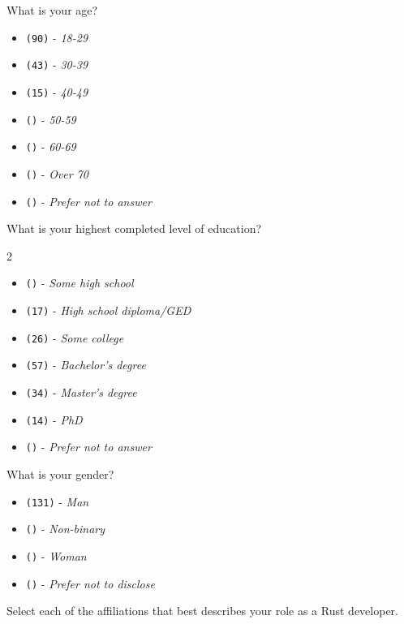 \begin{protocol}
\item \label{survey:dq1}  What is your age?
\begin{itemize}
\item \texttt{(90)} - \textit{18-29}
\item \texttt{(43)} - \textit{30-39}
\item \texttt{(15)} - \textit{40-49}
\item \texttt{()} - \textit{50-59}
\item \texttt{()} - \textit{60-69}
\item \texttt{()} - \textit{Over 70}
\item \texttt{()} - \textit{Prefer not to answer}
\end{itemize}
\item \label{survey:dq2}  What is your highest completed level of education?
\begin{multicols}{2}
\begin{itemize}
\item \texttt{()} - \textit{Some high school}
\item \texttt{(17)} - \textit{High school diploma/GED}
\item \texttt{(26)} - \textit{Some college}
\item \texttt{(57)} - \textit{Bachelor's degree}
\item \texttt{(34)} - \textit{Master's degree}
\item \texttt{(14)} - \textit{PhD}
\item \texttt{()} - \textit{Prefer not to answer}
\end{itemize}
\end{multicols}
\item \label{survey:dq3}  What is your gender?
\begin{itemize}
\item \texttt{(131)} - \textit{Man}
\item \texttt{()} - \textit{Non-binary}
\item \texttt{(\space {})} - \textit{Woman}
\item \texttt{()} - \textit{Prefer not to disclose}
\end{itemize}
\item \label{survey:dq4}  Select each of the affiliations that best describes your role as a Rust developer.
\begin{itemize}

\end{itemize}
\end{protocol}
